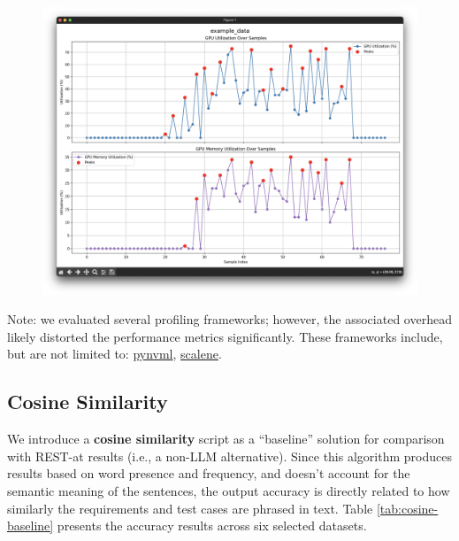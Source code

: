 \documentclass[conference]{IEEEtran}
\begin{document}
\begin{figure}[ht]
    \includegraphics[width=\columnwidth]{images/profiling-example.png}
\end{figure}


Note: we evaluated several profiling frameworks; however, the associated overhead likely distorted the performance metrics significantly. These frameworks include, but are not limited to: \href{https://github.com/gpuopenanalytics/pynvml}{pynvml}, \href{https://github.com/plasma-umass/scalene}{scalene}.

\subsection{Cosine Similarity}

We introduce a \textbf{cosine similarity} script as a ``baseline'' solution for comparison with REST-at results (i.e., a non-LLM alternative). 
Since this algorithm produces results based on word presence and frequency, and doesn't account for the semantic meaning of the sentences, the output accuracy is directly related to how similarly the requirements and test cases are phrased in text. Table \ref{tab:cosine-baseline} presents the accuracy results across six selected datasets.
\end{document}
